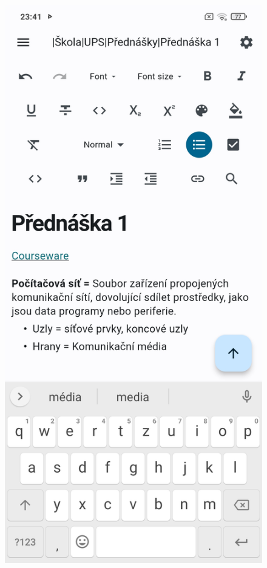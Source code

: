 \documentclass[czech, bc, kiv, he, iso690numb]{fasthesis}
\begin{document}
\begin{figure}[h!]
  \centering
  \begin{minipage}[h]{0.45\textwidth}
    \includegraphics[width=\textwidth]{img/BP-Runt/UserManual/EditingNote.jpg}

\end{minipage}
\end{figure}
\end{document}

